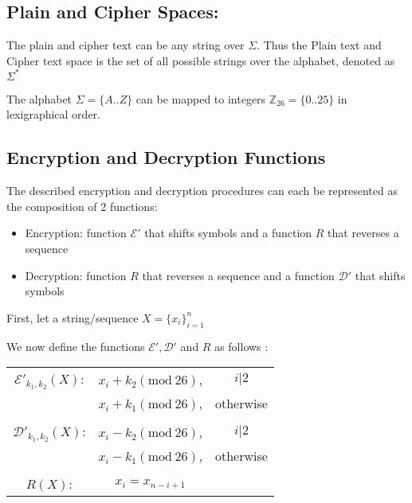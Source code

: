 \documentclass{article}
\numberwithin{equation}{subsection}
\begin{document}
	\subsection*{Plain and Cipher Spaces:}
	The plain and cipher text can be any string over $\Sigma$. Thus the Plain text and Cipher text space
	is the set of all possible strings over the alphabet, denoted as $\Sigma ^*$

	\underline{}
	\begin{adjustwidth}{1em}{1em}
	The alphabet $\Sigma = \{A..Z\}$ can be mapped to integers $\mathbb{Z}_{26} = \{0..25\}$ in lexigraphical
	order.	
	\end{adjustwidth}
	

	\vspace{20pt}
	\subsection*{Encryption and Decryption Functions}	
	The described encryption and decryption procedures can each be represented as the composition of 
	2 functions: 
	\begin{itemize}
		\item Encryption: function $\mathcal{E}'$ that shifts symbols and a function $R$ that reverses a sequence
		\item Decryption: function $R$ that reverses a sequence and a function $\mathcal{D}'$ that shifts symbols 
	\end{itemize}

	\vspace{5pt}
	First, let a string/sequence $X=\{x_i\}^n_{i=1}$ 

	We now define the functions $\mathcal{E}', \mathcal{D}'$ and $R$ as follows :

	\begin{center}
	\begin{tabular}{c c c}	
	$\mathcal{E}'_{k_1, k_2}(X)$: & $x_i+k_2(\textrm{mod}\ 26)$, & $i|2$ \\
																 & $x_i+k_1(\textrm{mod}\ 26)$, & otherwise\\
																 & 														 & \\
		$\mathcal{D}'_{k_1, k_2}(X)$: & $x_i-k_2(\textrm{mod}\ 26)$, & $i|2$ \\
																 & $x_i-k_1(\textrm{mod}\ 26)$, & otherwise\\
																 &&\\
		$R(X)$: 						&			$x_i = x_{n-i+1}$	

	\end{tabular}
	\end{center}
\end{document}
